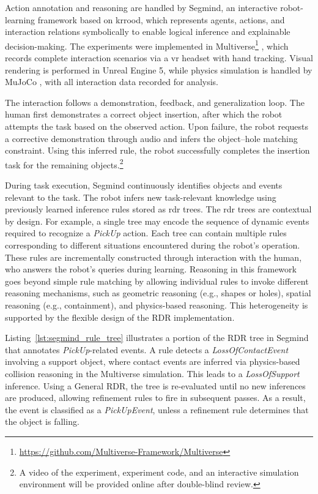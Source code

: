 \documentclass[a4paper,fleqn]{cas-sc}
\begin{document}
Action annotation and reasoning are handled by Segmind, an interactive robot-learning framework based on \ac{krrood}, which represents agents, actions, and interaction relations symbolically to enable logical inference and explainable decision-making. The experiments were implemented in Multiverse\footnote{\url{https://github.com/Multiverse-Framework/Multiverse}} \citep{Multiverse}, which records complete interaction scenarios via a \ac{vr} headset with hand tracking. Visual rendering is performed in Unreal Engine 5, while physics simulation is handled by MuJoCo \citep{todorov2012mujoco}, with all interaction data recorded for analysis.

The interaction follows a demonstration, feedback, and generalization loop. The human first demonstrates a correct object insertion, after which the robot attempts the task based on the observed action. Upon failure, the robot requests a corrective demonstration through audio and infers the object--hole matching constraint. Using this inferred rule, the robot successfully completes the insertion task for the remaining objects.\footnote{A video of the experiment, experiment code, and an interactive simulation environment will be provided online after double-blind review.}

During task execution, Segmind continuously identifies objects and events relevant to the task. The robot infers new task-relevant knowledge using previously learned inference rules stored as \ac{rdr} trees. The \ac{rdr} trees are contextual by design. For example, a single tree may encode the sequence of dynamic events required to recognize a \textit{PickUp} action. Each tree can contain multiple rules corresponding to different situations encountered during the robot's operation. These rules are incrementally constructed through interaction with the human, who answers the robot's queries during learning. Reasoning in this framework goes beyond simple rule matching by allowing individual rules to invoke different reasoning mechanisms, such as geometric reasoning (e.g., shapes or holes), spatial reasoning (e.g., containment), and physics-based reasoning. This heterogeneity is supported by the flexible design of the RDR implementation.

Listing~\ref{lst:segmind_rule_tree} illustrates a portion of the RDR tree in Segmind that annotates \textit{PickUp}-related events. A rule detects a \textit{LossOfContactEvent} involving a support object, where contact events are inferred via physics-based collision reasoning in the Multiverse simulation. This leads to a \textit{LossOfSupport} inference. Using a General RDR, the tree is re-evaluated until no new inferences are produced, allowing refinement rules to fire in subsequent passes. As a result, the event is classified as a \textit{PickUpEvent}, unless a refinement rule determines that the object is falling.
\end{document}
